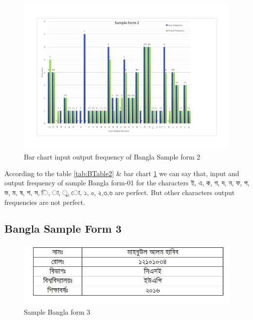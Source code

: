 \begin{figure}[H]
\centering
\includegraphics[width=1\textwidth]{Bform2.pdf}
\caption {Bar chart input output frequency of Bangla Sample form 2}
\label {fig:Bbar2}
\end{figure}

According to the table \ref{tab:BTable2} \& bar chart \ref{fig:Bbar2} we can say that, input and output frequency of sample Bangla form-01 for the characters {\bengalifont ই, এ, ক, গ, দ, ন, ফ, প, ভ, ম, ষ, শ, স, ি, া, ু, ো, ১, ০, ২,৩,৬ }are perfect. But other characters output frequencies are not perfect.

\subsection{Bangla Sample Form 3}
\begin{figure}[H]
\centering
\includegraphics[width=1\textwidth]{formBen03.JPG}
\caption {Sample Bangla form 3}
\label {fig:FormBan3}
\end{figure}


